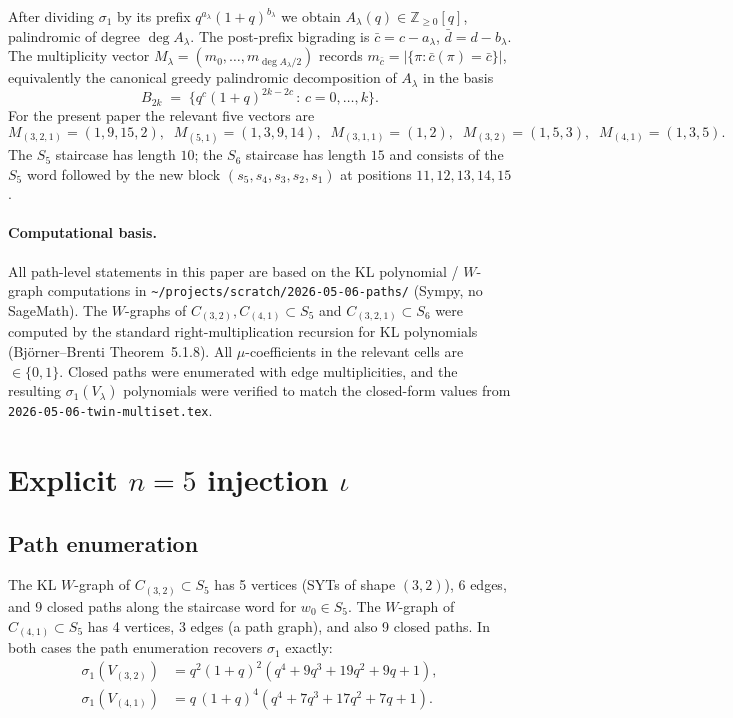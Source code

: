 \documentclass[11pt]{article}
\theoremstyle{definition}
\begin{document}
After dividing $\sigma_1$ by its prefix $q^{a_\lambda}(1+q)^{b_\lambda}$ we obtain $A_\lambda(q) \in \mathbb{Z}_{\geq 0}[q]$, palindromic of degree $\deg A_\lambda$. The post-prefix bigrading is $\bar c = c - a_\lambda$, $\bar d = d - b_\lambda$. The multiplicity vector $M_\lambda = (m_0,\dots,m_{\deg A_\lambda / 2})$ records $m_{\bar c} = |\{\pi : \bar c(\pi) = \bar c\}|$, equivalently the canonical greedy palindromic decomposition of $A_\lambda$ in the basis
\[
B_{2k} \;=\; \bigl\{q^c (1+q)^{2k-2c}\,:\, c = 0,\dots,k\bigr\}.
\]
For the present paper the relevant five vectors are
\begin{equation}\label{eq:five}
M_{(3,2,1)}=(1,9,15,2),\;\; M_{(5,1)}=(1,3,9,14),\;\; M_{(3,1,1)}=(1,2),\;\; M_{(3,2)}=(1,5,3),\;\; M_{(4,1)}=(1,3,5).
\end{equation}
The $S_5$ staircase has length $10$; the $S_6$ staircase has length $15$ and consists of the $S_5$ word followed by the new block $(s_5, s_4, s_3, s_2, s_1)$ at positions $11,12,13,14,15$.

\paragraph{Computational basis.} All path-level statements in this paper are based on the KL polynomial / $W$-graph computations in \texttt{\textasciitilde/projects/scratch/2026-05-06-paths/} (Sympy, no SageMath). The $W$-graphs of $C_{(3,2)}, C_{(4,1)} \subset S_5$ and $C_{(3,2,1)} \subset S_6$ were computed by the standard right-multiplication recursion for KL polynomials (Bj\"orner--Brenti Theorem~5.1.8). All $\mu$-coefficients in the relevant cells are $\in \{0,1\}$. Closed paths were enumerated with edge multiplicities, and the resulting $\sigma_1(V_\lambda)$ polynomials were verified to match the closed-form values from \texttt{2026-05-06-twin-multiset.tex}.

\section{Explicit $n=5$ injection $\iota$}\label{sec:n5}

\subsection*{Path enumeration}

The KL $W$-graph of $C_{(3,2)} \subset S_5$ has 5 vertices (SYTs of shape $(3,2)$), 6 edges, and 9 closed paths along the staircase word for $w_0 \in S_5$. The $W$-graph of $C_{(4,1)} \subset S_5$ has 4 vertices, 3 edges (a path graph), and also 9 closed paths. In both cases the path enumeration recovers $\sigma_1$ exactly:
\begin{align*}
\sigma_1(V_{(3,2)}) &= q^2(1+q)^2(q^4 + 9q^3 + 19q^2 + 9q + 1),\\
\sigma_1(V_{(4,1)}) &= q\,(1+q)^4 (q^4 + 7q^3 + 17q^2 + 7q + 1).
\end{align*}
\end{document}

